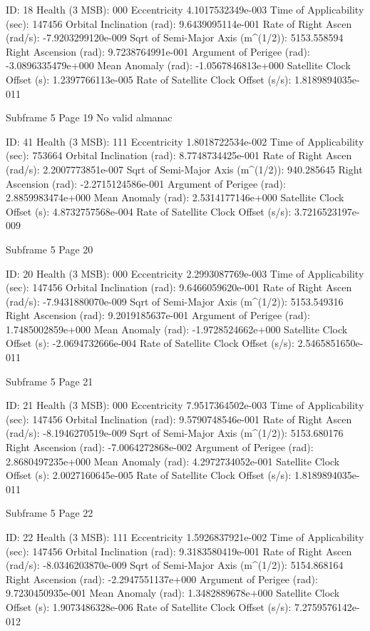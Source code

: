  ID:				     18
 Health (3 MSB):		     000
 Eccentricity			     4.1017532349e-003
 Time of Applicability (sec):	       147456
 Orbital Inclination (rad):	     9.6439095114e-001
 Rate of Right Ascen (rad/s):	     -7.9203299120e-009
 Sqrt of Semi-Major Axis (m^(1/2)):  5153.558594
 Right Ascension (rad): 	     9.7238764991e-001
 Argument of Perigee (rad):	     -3.0896335479e+000
 Mean Anomaly (rad):		     -1.0567846813e+000
 Satellite Clock Offset (s):	     1.2397766113e-005
 Rate of Satellite Clock Offset (s/s): 1.8189894035e-011

 Subframe  5 Page 19
No valid almanac

 ID:				     41
 Health (3 MSB):		     111
 Eccentricity			     1.8018722534e-002
 Time of Applicability (sec):	       753664
 Orbital Inclination (rad):	     8.7748734425e-001
 Rate of Right Ascen (rad/s):	     2.2007773851e-007
 Sqrt of Semi-Major Axis (m^(1/2)):  940.285645
 Right Ascension (rad): 	     -2.2715124586e-001
 Argument of Perigee (rad):	     2.8859983474e+000
 Mean Anomaly (rad):		     2.5314177146e+000
 Satellite Clock Offset (s):	     4.8732757568e-004
 Rate of Satellite Clock Offset (s/s): 3.7216523197e-009

 Subframe  5 Page 20

 ID:				     20
 Health (3 MSB):		     000
 Eccentricity			     2.2993087769e-003
 Time of Applicability (sec):	       147456
 Orbital Inclination (rad):	     9.6466059620e-001
 Rate of Right Ascen (rad/s):	     -7.9431880070e-009
 Sqrt of Semi-Major Axis (m^(1/2)):  5153.549316
 Right Ascension (rad): 	     9.2019185637e-001
 Argument of Perigee (rad):	     1.7485002859e+000
 Mean Anomaly (rad):		     -1.9728524662e+000
 Satellite Clock Offset (s):	     -2.0694732666e-004
 Rate of Satellite Clock Offset (s/s): 2.5465851650e-011

 Subframe  5 Page 21

 ID:				     21
 Health (3 MSB):		     000
 Eccentricity			     7.9517364502e-003
 Time of Applicability (sec):	       147456
 Orbital Inclination (rad):	     9.5790748546e-001
 Rate of Right Ascen (rad/s):	     -8.1946270519e-009
 Sqrt of Semi-Major Axis (m^(1/2)):  5153.680176
 Right Ascension (rad): 	     -7.0064272868e-002
 Argument of Perigee (rad):	     2.8680497235e+000
 Mean Anomaly (rad):		     4.2972734052e-001
 Satellite Clock Offset (s):	     2.0027160645e-005
 Rate of Satellite Clock Offset (s/s): 1.8189894035e-011

 Subframe  5 Page 22

 ID:				     22
 Health (3 MSB):		     111
 Eccentricity			     1.5926837921e-002
 Time of Applicability (sec):	       147456
 Orbital Inclination (rad):	     9.3183580419e-001
 Rate of Right Ascen (rad/s):	     -8.0346203870e-009
 Sqrt of Semi-Major Axis (m^(1/2)):  5154.868164
 Right Ascension (rad): 	     -2.2947551137e+000
 Argument of Perigee (rad):	     9.7230450935e-001
 Mean Anomaly (rad):		     1.3482889678e+000
 Satellite Clock Offset (s):	     1.9073486328e-006
 Rate of Satellite Clock Offset (s/s): 7.2759576142e-012

